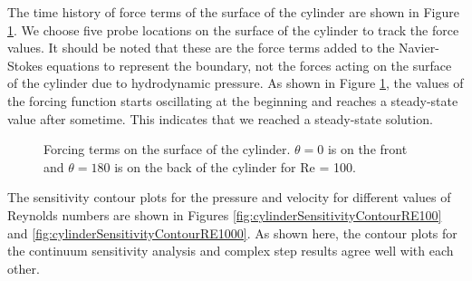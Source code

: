 \documentclass[12pt]{aiaa-pretty}
\begin{document}
The time history of force terms of the surface of the cylinder are shown in Figure \ref{fig:cylinderForceTerms}. We choose five probe locations on the surface of the cylinder to track the force values. It should be noted that these are the force terms added to the Navier-Stokes equations to represent the boundary, not the forces acting on the surface of the cylinder due to hydrodynamic pressure. As shown in Figure \ref{fig:cylinderForceTerms}, the values of the forcing function starts oscillating at the beginning and reaches a steady-state value after sometime. This indicates that we reached a steady-state solution.

%
\begin{figure}[H]
	\centering
	\quad
	\caption{Forcing terms on the surface of the cylinder. $\theta = 0$ is on the front and $\theta = 180$ is on the back of the cylinder for Re = 100.}
	\label{fig:cylinderForceTerms}
\end{figure}
%

The sensitivity contour plots for the pressure and velocity for different values of Reynolds numbers are shown in Figures \ref{fig:cylinderSensitivityContourRE100} and \ref{fig:cylinderSensitivityContourRE1000}. As shown here, the contour plots for the continuum sensitivity analysis and complex step results agree well with each other.
\end{document}
